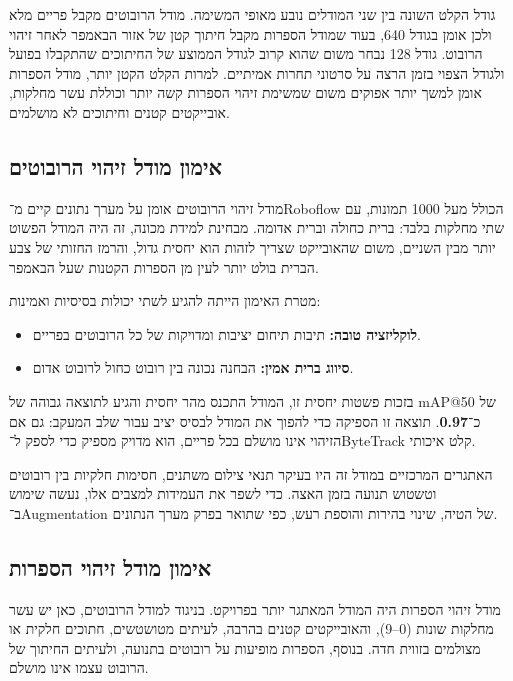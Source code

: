 גודל הקלט השונה בין שני המודלים נובע מאופי המשימה. מודל הרובוטים מקבל
פריים מלא ולכן אומן בגודל 640, בעוד שמודל הספרות מקבל חיתוך קטן של
אזור הבאמפר לאחר זיהוי הרובוט. גודל 128 נבחר משום שהוא קרוב לגודל
הממוצע של החיתוכים שהתקבלו בפועל ולגודל הצפוי בזמן הרצה על סרטוני
תחרות אמיתיים. למרות הקלט הקטן יותר, מודל הספרות אומן למשך יותר אפוקים
משום שמשימת זיהוי הספרות קשה יותר וכוללת עשר מחלקות, אובייקטים קטנים
וחיתוכים לא מושלמים.

\subsection{אימון מודל זיהוי הרובוטים}

מודל זיהוי הרובוטים אומן על מערך נתונים קיים מ־\textenglish{Roboflow}
הכולל מעל 1000 תמונות, עם שתי מחלקות בלבד: ברית כחולה וברית אדומה.
מבחינת למידת מכונה, זה היה המודל הפשוט יותר מבין השניים, משום שהאובייקט
שצריך לזהות הוא יחסית גדול, והרמז החזותי של צבע הברית בולט יותר לעין מן
הספרות הקטנות שעל הבאמפר.

מטרת האימון הייתה להגיע לשתי יכולות בסיסיות ואמינות:

\begin{itemize}
\item \textbf{לוקליזציה טובה:} תיבות תיחום יציבות ומדויקות של כל
  הרובוטים בפריים.
\item \textbf{סיווג ברית אמין:} הבחנה נכונה בין רובוט כחול לרובוט אדום.
\end{itemize}

בזכות פשטות יחסית זו, המודל התכנס מהר יחסית והגיע לתוצאה גבוהה של
\textenglish{mAP@50} של כ־\textbf{0.97}. תוצאה זו הספיקה כדי להפוך את
המודל לבסיס יציב עבור שלב המעקב: גם אם הזיהוי אינו מושלם בכל פריים,
הוא מדויק מספיק כדי לספק ל־\textenglish{ByteTrack} קלט איכותי.

האתגרים המרכזיים במודל זה היו בעיקר תנאי צילום משתנים, חסימות חלקיות
בין רובוטים וטשטוש תנועה בזמן האצה. כדי לשפר את העמידות למצבים אלו,
נעשה שימוש ב־\textenglish{Augmentation} של הטיה, שינוי בהירות והוספת
רעש, כפי שתואר בפרק מערך הנתונים.

\subsection{אימון מודל זיהוי הספרות}

מודל זיהוי הספרות היה המודל המאתגר יותר בפרויקט. בניגוד למודל
הרובוטים, כאן יש עשר מחלקות שונות (0--9), והאובייקטים קטנים בהרבה,
לעיתים מטושטשים, חתוכים חלקית או מצולמים בזווית חדה. בנוסף, הספרות
מופיעות על רובוטים בתנועה, ולעיתים החיתוך של הרובוט עצמו אינו מושלם.

